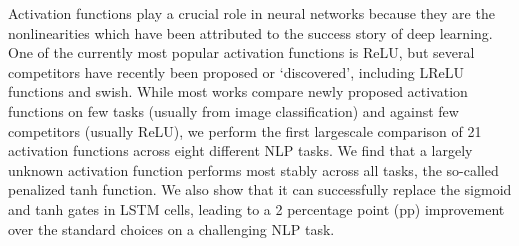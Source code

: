 Activation functions play a crucial role in neural networks because they are the nonlinearities which have been attributed to the success story of deep learning. One of the currently most popular activation functions is ReLU, but several competitors have recently been proposed or ‘discovered', including LReLU functions and swish. While most works compare newly proposed activation functions on few tasks (usually from image classification) and against few competitors (usually ReLU), we perform the first largescale comparison of 21 activation functions across eight different NLP tasks. We find that a largely unknown activation function performs most stably across all tasks, the so-called penalized tanh function. We also show that it can successfully replace the sigmoid and tanh gates in LSTM cells, leading to a 2 percentage point (pp) improvement over the standard choices on a challenging NLP task.
